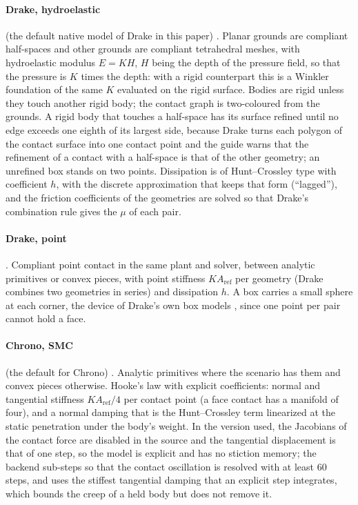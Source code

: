 \paragraph{Drake, hydroelastic} (the default native model of Drake in this paper)
\cite{DrakeHydroGuide,DrakeHydroParams}. Planar grounds are compliant half-spaces and other
grounds are compliant tetrahedral meshes, with hydroelastic modulus $E = K H$, $H$ being the
depth of the pressure field, so that the pressure is $K$ times the depth: with a rigid
counterpart this is a Winkler foundation of the same $K$ evaluated on the rigid surface. Bodies
are rigid unless they touch another rigid body; the contact graph is two-coloured from the
grounds. A rigid body that touches a half-space has its surface refined until no edge exceeds
one eighth of its largest side, because Drake turns each polygon of the contact surface into one
contact point and the guide warns that the refinement of a contact with a half-space is that of
the other geometry; an unrefined box stands on two points. Dissipation is of Hunt--Crossley
type with coefficient $h$, with the discrete approximation that keeps that form (``lagged''),
and the friction coefficients of the geometries are solved so that Drake's combination rule
gives the $\mu$ of each pair.

\paragraph{Drake, point} \cite{DrakePointContact}. Compliant point contact in the same plant
and solver, between analytic primitives or convex pieces, with point stiffness $K A_\mathrm{ref}$
per geometry (Drake combines two geometries in series) and dissipation $h$. A box carries a
small sphere at each corner, the device of Drake's own box models \cite{DrakeFoamBrick}, since
one point per pair cannot hold a face.

\paragraph{Chrono, SMC} (the default for Chrono) \cite{ChronoCollisions,ChronoSMCSource}.
Analytic primitives where the scenario has them and convex pieces otherwise. Hooke's law with
explicit coefficients: normal and tangential stiffness $K A_\mathrm{ref}/4$ per contact point
(a face contact has a manifold of four), and a normal damping that is the Hunt--Crossley term
linearized at the static penetration under the body's weight. In the version used, the
Jacobians of the contact force are disabled in the source and the tangential displacement is
that of one step, so the model is explicit and has no stiction memory; the backend sub-steps so
that the contact oscillation is resolved with at least 60 steps, and uses the stiffest tangential
damping that an explicit step integrates, which bounds the creep of a held body but does not
remove it.

